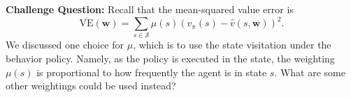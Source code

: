 \textbf{Challenge Question:} Recall that the mean-squared value error is 
$$\overline{\text{VE}}(\mathbf{w}) = \sum_{s \in \mathcal{S}} \mu(s) (v_\pi(s) - \hat{v}(s, \mathbf{w}))^2.$$ 
We discussed one choice for $\mu$, which is to use the state visitation under the behavior policy. Namely, as the policy is executed in the state, the weighting $\mu(s)$ is proportional to how frequently the agent is in state $s$. What are some other weightings could be used instead?